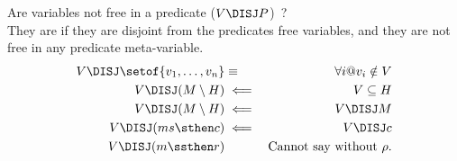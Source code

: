 Are variables not free in a predicate ($V \DISJ P$)~?
\\They are if they are disjoint from the predicates free variables,
and they are not free in any predicate meta-variable.
\begin{eqnarray*}
  V \DISJ \setof{v_1,\ldots,v_n} &\equiv& \forall i @ v_i \notin V
\\ V \DISJ (M \setminus H) &\impliedby& V \subseteq H
\\ V \DISJ (M \setminus H) &\impliedby& V \DISJ M
\\ V\DISJ (ms \sthen c) &\impliedby& V \DISJ c
\\ V\DISJ (m \ssthen r) && \textrm{Cannot say without } \rho.
\end{eqnarray*}